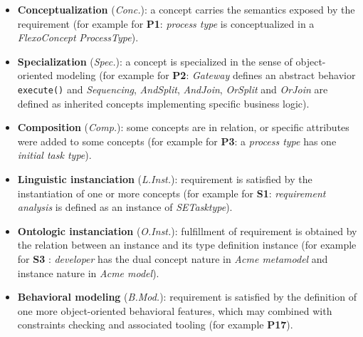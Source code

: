 \begin{itemize}
    \item \textbf{Conceptualization} (\textit{Conc.}): a concept carries the semantics exposed by the requirement (for example for \textbf{P1}: \textit{process type} is conceptualized in a \textit{FlexoConcept} \textit{ProcessType}).
    \item \textbf{Specialization} (\textit{Spec.}): a concept is specialized in the sense of object-oriented modeling (for example for \textbf{P2}: \textit{Gateway} defines an abstract behavior \texttt{execute()} and \textit{Sequencing}, \textit{AndSplit}, \textit{AndJoin}, \textit{OrSplit} and \textit{OrJoin} are defined as inherited concepts implementing specific business logic).
    \item \textbf{Composition} (\textit{Comp.}): some concepts are in relation, or specific attributes were added to some concepts (for example for \textbf{P3}: a \textit{process type} has one \textit{initial task type}).
    \item \textbf{Linguistic instanciation} (\textit{L.Inst.}): requirement is satisfied by the instantiation of one or more concepts (for example for \textbf{S1}: \textit{requirement analysis} is defined as an instance of \textit{SETasktype}).
    \item \textbf{Ontologic instanciation} (\textit{O.Inst.}): fulfillment of requirement is obtained by the relation between an instance and its type definition instance (for example for \textbf{S3} : \textit{developer} has the dual concept nature in \textit{Acme metamodel} and instance nature in \textit{Acme model}).
    \item \textbf{Behavioral modeling} (\textit{B.Mod.}): requirement is satisfied by the definition of one more object-oriented behavioral features, which may combined with constraints checking and associated tooling (for example \textbf{P17}).
\end{itemize}




